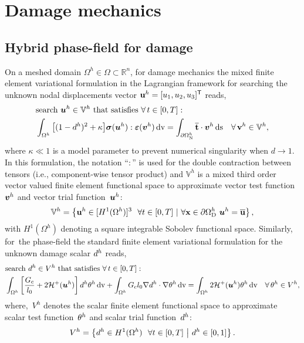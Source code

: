 \pagebreak

\section{Damage mechanics}
\subsection{Hybrid phase-field for damage}
On a meshed domain $\Omega^h\in\Omega\subset\mathbb{R}^n$, for damage mechanics the mixed finite element variational formulation in the Lagrangian framework for searching the unknown nodal displacements vector ${\textbf{u}}^h=[u_1,u_2,u_3]^\mathsf{T}$ reads,
%
%
\begin{equation}\label{Eq:VarfU}
\begin{aligned}
&\text{search}~\boldsymbol u^h\in\mathbb{V}^h \text{~that satisfies}~\forall\, t\in[0,T]:\\
&\int_{\Omega^h}\big[(1-d^h)^2 + \kappa \big]\boldsymbol{\sigma}(\boldsymbol u^h) : \boldsymbol{\varepsilon}(\boldsymbol v^h) \,\mathrm{d}\text{v}= \int_{\partial\Omega^h_\text{N}} \overline{{\textbf t}}\cdot\boldsymbol v^h \,\mathrm{d}\text{s} \quad\forall\,{\textbf{v}}^h\in\mathbb{V}^h,
\end{aligned}
\end{equation}
where $\kappa\ll1$ is a model parameter to prevent numerical singularity when $d \to 1$.
In this formulation, the notation ``$:$'' is used for the double contraction between tensors (i.e., component-wise tensor product) and $ \mathbb{V}^h $ is a  mixed third order vector valued finite element functional space to approximate vector test function~$\boldsymbol v^h$ and vector trial function~$\boldsymbol u^h$:
\begin{equation}
\mathbb{V}^h=\left\{ {\textbf{u}}^h\in [ {H}^1(\Omega^h) ]^3~~\forall t\in[0,T]~|~ \forall {\textbf{x}}\in\partial\Omega^h_{\text{D}}~\boldsymbol u^h=\overline{{\textbf{u}}}\right\},
\end{equation}
%
with ${H}^1(\Omega^h)$ denoting a square integrable Sobolev functional space.
Similarly, for~the phase-field the standard finite element variational formulation for the unknown damage scalar $d^h$ reads, 
%
%
\begin{equation}
\begin{aligned}\label{Eq:VarfPhi}
&\text{search}~d^h\in{{V}}^h \text{~that satisfies}~\forall\, t\in[0,T]:\\
&\int_{\Omega^h}\left[ \frac{G_{\text{c}}}{l_0} + 2 \mathcal{H}^{+}(\boldsymbol u^h) \right]d^h\theta^h\, \mathrm{d}\text{v} + \int_{\Omega^h} {G_{\text{c}}}{l_0}\nabla d^h \cdot \nabla\theta^h \, \mathrm{d}\text{v}= \int_{\Omega^h} 2\mathcal{H}^{+}(\boldsymbol u^h)\theta^h \, \mathrm{d}\text{v}\quad\forall\,\theta^h\in{{V}}^h, 
\end{aligned}
\end{equation}
%
%
where,~${{V}}^h$ denotes the scalar finite element functional space to approximate scalar test function~$\theta^h$ and scalar trial function~$d^h$:
\begin{equation}
{{V}}^h=\left\{d^h \in  {H}^1(\Omega^h)~~\forall t\in[0,T]~\middle|~d^h\in[0,1]  \right\}.
\end{equation}


